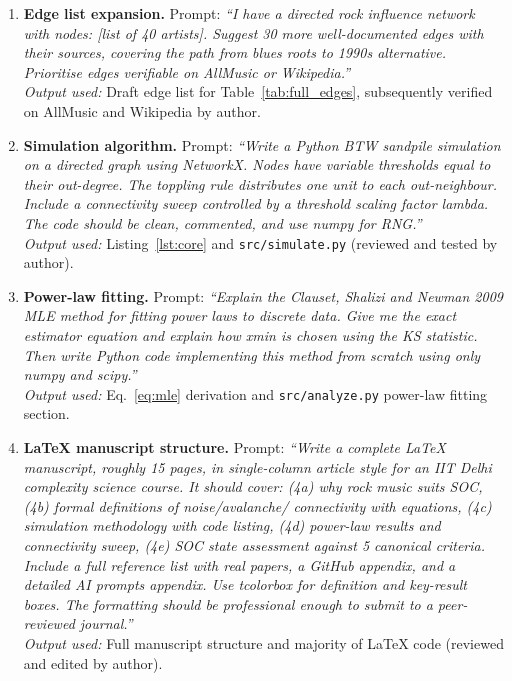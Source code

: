 \documentclass[12pt, a4paper]{article}
\begin{document}
\begin{enumerate}[label=\textbf{C\arabic*.}, leftmargin=*, itemsep=6pt]
  \item \textbf{Edge list expansion.}
  Prompt: \textit{``I have a directed rock influence network with
  nodes: [list of 40 artists]. Suggest 30 more well-documented
  edges with their sources, covering the path from blues roots
  to 1990s alternative. Prioritise edges verifiable on AllMusic
  or Wikipedia.''}\\
  \textit{Output used:} Draft edge list for Table~\ref{tab:full_edges},
  subsequently verified on AllMusic and Wikipedia by author.

  \item \textbf{Simulation algorithm.}
  Prompt: \textit{``Write a Python BTW sandpile simulation on a
  directed graph using NetworkX. Nodes have variable thresholds
  equal to their out-degree. The toppling rule distributes one
  unit to each out-neighbour. Include a connectivity sweep
  controlled by a threshold scaling factor lambda. The code
  should be clean, commented, and use numpy for RNG.''}\\
  \textit{Output used:} Listing~\ref{lst:core} and
  \texttt{src/simulate.py} (reviewed and tested by author).

  \item \textbf{Power-law fitting.}
  Prompt: \textit{``Explain the Clauset, Shalizi and Newman 2009
  MLE method for fitting power laws to discrete data.
  Give me the exact estimator equation and explain how xmin
  is chosen using the KS statistic. Then write Python code
  implementing this method from scratch using only numpy
  and scipy.''}\\
  \textit{Output used:} Eq.~\ref{eq:mle} derivation and
  \texttt{src/analyze.py} power-law fitting section.

  \item \textbf{LaTeX manuscript structure.}
  Prompt: \textit{``Write a complete LaTeX manuscript, roughly
  15 pages, in single-column article style for an IIT Delhi
  complexity science course. It should cover: (4a) why rock
  music suits SOC, (4b) formal definitions of noise/avalanche/
  connectivity with equations, (4c) simulation methodology with
  code listing, (4d) power-law results and connectivity sweep,
  (4e) SOC state assessment against 5 canonical criteria.
  Include a full reference list with real papers, a GitHub
  appendix, and a detailed AI prompts appendix. Use tcolorbox
  for definition and key-result boxes. The formatting should be
  professional enough to submit to a peer-reviewed journal.''}\\
  \textit{Output used:} Full manuscript structure and
  majority of LaTeX code (reviewed and edited by author).


\end{enumerate}
\end{document}
